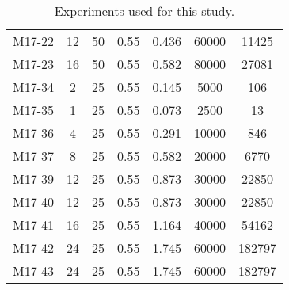 \begin{table}
\begin{tabular}{lcccccc}
 M17-22 &  12 &  50 &  0.55 &  0.436 &  60000 &  11425 \\
 M17-23 &  16 &  50 &  0.55 &  0.582 &  80000 &  27081 \\
 M17-34 &   2 &  25 &  0.55 &  0.145 &   5000 &    106 \\
 M17-35 &   1 &  25 &  0.55 &  0.073 &   2500 &     13 \\
 M17-36 &   4 &  25 &  0.55 &  0.291 &  10000 &    846 \\
 M17-37 &   8 &  25 &  0.55 &  0.582 &  20000 &   6770 \\
 M17-39 &  12 &  25 &  0.55 &  0.873 &  30000 &  22850 \\
 M17-40 &  12 &  25 &  0.55 &  0.873 &  30000 &  22850 \\
 M17-41 &  16 &  25 &  0.55 &  1.164 &  40000 &  54162 \\
 M17-42 &  24 &  25 &  0.55 &  1.745 &  60000 &  182797 \\
 M17-43 &  24 &  25 &  0.55 &  1.745 &  60000 &  182797 \\
 \bottomrule
\end{tabular}
\caption{\label{table:exp} Experiments used for this study.}
\end{table}
